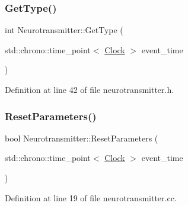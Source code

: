 \mbox{\label{class_neurotransmitter_a45414c0d173758edbbf9318a7eccb623}} 
\subsubsection{\texorpdfstring{Get\+Type()}{GetType()}}
{\footnotesize\ttfamily int Neurotransmitter\+::\+Get\+Type (\begin{DoxyParamCaption}\item[{std\+::chrono\+::time\+\_\+point$<$ \mbox{\hyperlink{universe_8h_a0ef8d951d1ca5ab3cfaf7ab4c7a6fd80}{Clock}} $>$}]{event\+\_\+time }\end{DoxyParamCaption})\hspace{0.3cm}{\ttfamily [inline]}}



Definition at line 42 of file neurotransmitter.\+h.

\mbox{\label{class_neurotransmitter_a6e7650d738bccfbbd49ede10970687aa}} 
\subsubsection{\texorpdfstring{Reset\+Parameters()}{ResetParameters()}}
{\footnotesize\ttfamily bool Neurotransmitter\+::\+Reset\+Parameters (\begin{DoxyParamCaption}\item[{std\+::chrono\+::time\+\_\+point$<$ \mbox{\hyperlink{universe_8h_a0ef8d951d1ca5ab3cfaf7ab4c7a6fd80}{Clock}} $>$}]{event\+\_\+time }\end{DoxyParamCaption})}



Definition at line 19 of file neurotransmitter.\+cc.

